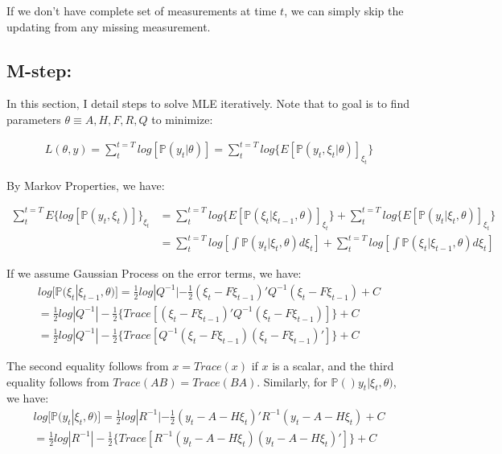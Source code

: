 \documentclass[12pt]{article}
\numberwithin{equation}{section}
\begin{document}
If we don't have complete set of measurements at time $t$, we can simply skip the updating from any missing measurement.

\subsection{M-step:} \label{subsec:M}

In this section, I detail steps to solve MLE iteratively. Note that to goal is to find parameters $\theta \equiv {A, H, F, R, Q}$ to minimize:

\begin{align}
    L(\theta,y) = \sum_t^{t=T}log[\mathbb{P}(y_t|\theta)] = \sum_t^{t=T}log\{E[\mathbb{P}(y_t,\xi_t|\theta)]_{\xi_t}\} \label{eq:MLE}
\end{align} 

By Markov Properties, we have: 

\begin{align}
    \sum_t^{t=T}E\{log[\mathbb{P}(y_t,\xi_t)]\}_{\xi_t} &= \sum_t^{t=T}log\{E[\mathbb{P}(\xi_t|\xi_{t-1},\theta)]_{\xi_t}\}
    + \sum_t^{t=T}log\{E[\mathbb{P}(y_t|\xi_t, \theta)]_{\xi_t}\} \nonumber \\
    & = \sum_t^{t=T}log\left[\int\mathbb{P}(y_t|\xi_t,\theta)d\xi_t\right]
    + \sum_t^{t=T}log\left[\int\mathbb{P}(\xi_t|\xi_{t-1},\theta)d\xi_t\right] \nonumber 
\end{align}

If we assume Gaussian Process on the error terms, we have:
\begin{align}
    log[\mathbb{P}(\xi_t|\xi_{t-1},\theta)] = \frac{1}{2}log|Q^{-1}|-\frac{1}{2}(\xi_t-F\xi_{t-1})'Q^{-1}(\xi_t-F\xi_{t-1}) + C \nonumber \\
    = \frac{1}{2}log|Q^{-1}|-\frac{1}{2}\{Trace[(\xi_t-F\xi_{t-1})'Q^{-1}(\xi_t-F\xi_{t-1})]\} + C \nonumber \\
    = \frac{1}{2}log|Q^{-1}|-\frac{1}{2}\{Trace[Q^{-1}(\xi_t-F\xi_{t-1})(\xi_t-F\xi_{t-1})']\} + C \label{eq:mle_xi}
\end{align}

The second equality follows from $x = Trace(x)$ if $x$ is a scalar, and the third equality follows from $Trace(AB) = Trace(BA)$. Similarly, for $\mathbb{P}()y_t|\xi_{t},\theta)$, we have:
\begin{align}
    log[\mathbb{P}(y_t|\xi_{t},\theta)] = \frac{1}{2}log|R^{-1}|-\frac{1}{2}(y_t-A-H\xi_t)'R^{-1}(y_t-A-H\xi_t) + C \nonumber \\
    = \frac{1}{2}log|R^{-1}|-\frac{1}{2}\{Trace[R^{-1}(y_t-A-H\xi_{t})(y_t-A-H\xi_{t})']\} + C \label{eq:mle_y} 
\end{align}
\end{document}
